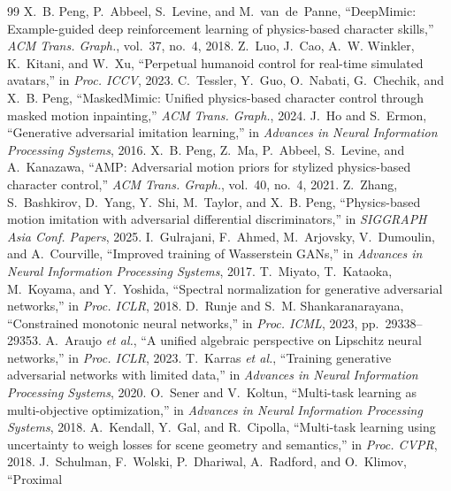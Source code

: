 \documentclass[letterpaper, 10pt, conference]{ieeeconf}
\begin{document}
\footnotesize
{}
\begin{thebibliography}{99}
\setlength{\itemsep}{0pt}
X.~B. Peng, P.~Abbeel, S.~Levine, and M.~van~de~Panne, ``DeepMimic:
Example-guided deep reinforcement learning of physics-based character
skills,'' \emph{ACM Trans. Graph.}, vol.~37, no.~4, 2018.
Z.~Luo, J.~Cao, A.~W. Winkler, K.~Kitani, and W.~Xu, ``Perpetual humanoid
control for real-time simulated avatars,'' in \emph{Proc. ICCV}, 2023.
C.~Tessler, Y.~Guo, O.~Nabati, G.~Chechik, and X.~B. Peng, ``MaskedMimic:
Unified physics-based character control through masked motion inpainting,''
\emph{ACM Trans. Graph.}, 2024.
J.~Ho and S.~Ermon, ``Generative adversarial imitation learning,'' in
\emph{Advances in Neural Information Processing Systems}, 2016.
X.~B. Peng, Z.~Ma, P.~Abbeel, S.~Levine, and A.~Kanazawa, ``AMP: Adversarial
motion priors for stylized physics-based character control,'' \emph{ACM Trans.
Graph.}, vol.~40, no.~4, 2021.
Z.~Zhang, S.~Bashkirov, D.~Yang, Y.~Shi, M.~Taylor, and X.~B. Peng,
``Physics-based motion imitation with adversarial differential
discriminators,'' in \emph{SIGGRAPH Asia Conf. Papers}, 2025.
I.~Gulrajani, F.~Ahmed, M.~Arjovsky, V.~Dumoulin, and A.~Courville,
``Improved training of Wasserstein GANs,'' in \emph{Advances in Neural
Information Processing Systems}, 2017.
T.~Miyato, T.~Kataoka, M.~Koyama, and Y.~Yoshida, ``Spectral normalization
for generative adversarial networks,'' in \emph{Proc. ICLR}, 2018.
D.~Runje and S.~M. Shankaranarayana, ``Constrained monotonic neural
networks,'' in \emph{Proc. ICML}, 2023, pp.~29338--29353.
A.~Araujo \textit{et al.}, ``A unified algebraic perspective on Lipschitz
neural networks,'' in \emph{Proc. ICLR}, 2023.
T.~Karras \textit{et al.}, ``Training generative adversarial networks with
limited data,'' in \emph{Advances in Neural Information Processing
Systems}, 2020.
O.~Sener and V.~Koltun, ``Multi-task learning as multi-objective
optimization,'' in \emph{Advances in Neural Information Processing Systems},
2018.
A.~Kendall, Y.~Gal, and R.~Cipolla, ``Multi-task learning using uncertainty
to weigh losses for scene geometry and semantics,'' in \emph{Proc. CVPR},
2018.
J.~Schulman, F.~Wolski, P.~Dhariwal, A.~Radford, and O.~Klimov, ``Proximal

\end{thebibliography}
\end{document}
